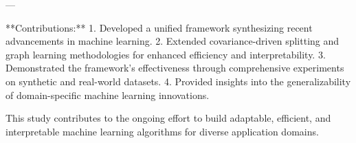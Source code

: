 ---

**Contributions:**  
1. Developed a unified framework synthesizing recent advancements in machine learning.  
2. Extended covariance-driven splitting and graph learning methodologies for enhanced efficiency and interpretability.  
3. Demonstrated the framework's effectiveness through comprehensive experiments on synthetic and real-world datasets.  
4. Provided insights into the generalizability of domain-specific machine learning innovations.  

This study contributes to the ongoing effort to build adaptable, efficient, and interpretable machine learning algorithms for diverse application domains.